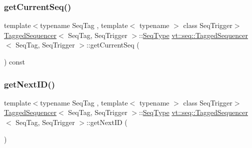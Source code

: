\mbox{\label{structvt_1_1seq_1_1_tagged_sequencer_ad5f953ad23ebde1a92fdd13256575f32}} 
\subsubsection{\texorpdfstring{get\+Current\+Seq()}{getCurrentSeq()}}
{\footnotesize\ttfamily template$<$typename Seq\+Tag , template$<$ typename $>$ class Seq\+Trigger$>$ \\
\hyperlink{structvt_1_1seq_1_1_tagged_sequencer}{Tagged\+Sequencer}$<$ Seq\+Tag, Seq\+Trigger $>$\+::\hyperlink{structvt_1_1seq_1_1_tagged_sequencer_a1c8ee839258d0f88c49ef660267a81d5}{Seq\+Type} \hyperlink{structvt_1_1seq_1_1_tagged_sequencer}{vt\+::seq\+::\+Tagged\+Sequencer}$<$ Seq\+Tag, Seq\+Trigger $>$\+::get\+Current\+Seq (\begin{DoxyParamCaption}{ }\end{DoxyParamCaption}) const}

\mbox{\label{structvt_1_1seq_1_1_tagged_sequencer_a243149e1efcc57ae08fb265b09ef9a60}} 
\subsubsection{\texorpdfstring{get\+Next\+I\+D()}{getNextID()}}
{\footnotesize\ttfamily template$<$typename Seq\+Tag , template$<$ typename $>$ class Seq\+Trigger$>$ \\
\hyperlink{structvt_1_1seq_1_1_tagged_sequencer}{Tagged\+Sequencer}$<$ Seq\+Tag, Seq\+Trigger $>$\+::\hyperlink{structvt_1_1seq_1_1_tagged_sequencer_a1c8ee839258d0f88c49ef660267a81d5}{Seq\+Type} \hyperlink{structvt_1_1seq_1_1_tagged_sequencer}{vt\+::seq\+::\+Tagged\+Sequencer}$<$ Seq\+Tag, Seq\+Trigger $>$\+::get\+Next\+ID (\begin{DoxyParamCaption}{ }\end{DoxyParamCaption})\hspace{0.3cm}{\ttfamily [virtual]}}



